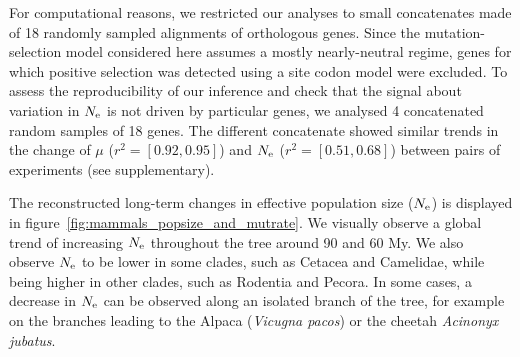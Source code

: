 \documentclass{MBE}
\begin{document}
	For computational reasons, we restricted our analyses to small concatenates made of 18 randomly sampled alignments of orthologous genes.
	Since the mutation-selection model considered here assumes a mostly nearly-neutral regime, genes for which positive selection was detected using a site codon model were excluded.
	To assess the reproducibility of our inference and check that the signal about variation in $N_{\text{e}}$ is not driven by particular genes, we analysed 4 concatenated random samples of 18 genes.
	The different concatenate showed similar trends in the change of $\mu$ ($r^2=[0.92,0.95]$) and $N_{\text{e}}$ ($r^2=[0.51,0.68]$) between pairs of experiments (see supplementary).

	The reconstructed long-term changes in {effective population size} ($N_{\text{e}}$) is displayed in figure~\ref{fig:mammals_popsize_and_mutrate}.
	We visually observe a global trend of increasing $N_{\text{e}}$ throughout the tree around 90 and 60 My.
	We also observe $N_{\text{e}}$ to be lower in some clades, such as Cetacea and Camelidae, while being higher in other clades, such as Rodentia and Pecora.
	In some cases, a decrease in $N_{\text{e}}$ can be observed along an isolated branch of the tree, for example on the branches leading to the Alpaca (\textit{Vicugna pacos}) or the cheetah \textit{Acinonyx jubatus}.
\end{document}
